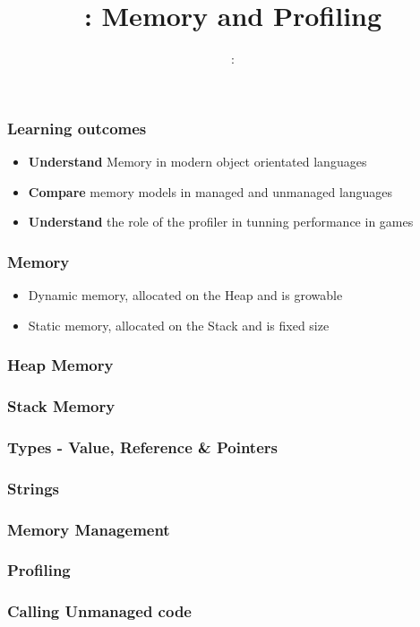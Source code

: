 \usepackage{../../beamerthemeFalmouthGamesAcademy}
\usepackage{multimedia}
\graphicspath{ {../../} }


\usepackage[normalem]{ulem}
\usepackage{wasysym}
\usepackage{listings}
\usepackage{pdfpages}

\usetikzlibrary{arrows,automata}




\title{\sessionnumber: Memory and Profiling}
\subtitle{\modulecode: \moduletitle}

\frame{\titlepage}

\begin{frame}
	\frametitle{Learning outcomes}
	\begin{itemize}
		\item \textbf{Understand} Memory in modern object orientated languages
		\item \textbf{Compare} memory models in managed and unmanaged languages
		\item \textbf{Understand} the role of the profiler in tunning performance in games
	\end{itemize}
\end{frame}

\begin{frame}
  \frametitle{Memory}
  \begin{itemize}
    \item Dynamic memory, allocated on the Heap and is growable
    \item Static memory, allocated on the Stack and is fixed size
  \end{itemize}
\end{frame}

\begin{frame}
  \frametitle{Heap Memory}
\end{frame}

\begin{frame}
  \frametitle{Stack Memory}
\end{frame}

\begin{frame}
  \frametitle{Types - Value, Reference & Pointers}
\end{frame}

\begin{frame}
  \frametitle{Strings}
\end{frame}

\begin{frame}
  \frametitle{Memory Management}
\end{frame}

\begin{frame}
  \frametitle{Profiling}
\end{frame}

\begin{frame}
  \frametitle{Calling Unmanaged code}
\end{frame}


